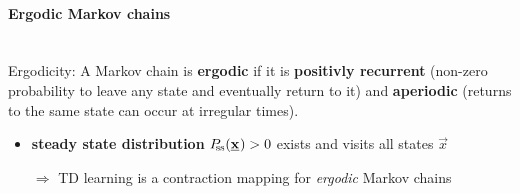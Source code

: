 \paragraph{Ergodic Markov chains}\mbox{}\\
Ergodicity: A Markov chain is {\bf ergodic} if it is
		{\bf positivly recurrent} 
		(non-zero probability to leave any state and 
		eventually return to it) and {\bf aperiodic} 
		(returns to the same state can occur at irregular times).
\begin{itemize}
		\item {\bf steady state distribution} 
			$P_{\kern-.5ex\text{ss}}(\underline{\mathbf{x}}_{{}}) > 0$ exists and visits all states $\vec x$ 
	\end{itemize}
	\vspace{4mm}
	\begin{itemize}
		\item[$\Rightarrow$] TD learning is a contraction mapping 
			for {\em ergodic} Markov chains
	\end{itemize}


